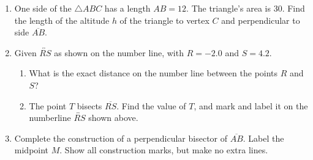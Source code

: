 \documentclass[12pt, twoside]{article}
\begin{document}
\begin{enumerate}
\newpage

  \item One side of the $\triangle ABC$ has a length $AB=12$. The triangle's area is 30. Find the length of the altitude $h$ of the triangle to vertex $C$ and perpendicular to side $\overline{AB}$.\\[0.5cm]
   \vspace{1.0cm}


  \item Given $\overleftrightarrow{RS}$ as shown on the number line, with $R=-2.0$ and $S=4.2$. \\[20pt] %
  \begin{enumerate}
    \item What is the exact distance on the number line between the points $R$ and $S$? \vspace{3cm} 
    \item The point $T$ bisects $\overline{RS}$. Find the value of $T$, and mark and label it on the numberline $\overleftrightarrow{RS}$ shown above. 
  \end{enumerate} \vspace{3cm}  
  
\newpage

  \item Complete the construction of a perpendicular bisector of $\overline{AB}$. Label the midpoint $M$. Show all construction marks, but make no extra lines. \vspace{2cm}
  \begin{center}
  \end{center} \vspace{4cm}


\end{enumerate}
\end{document}
